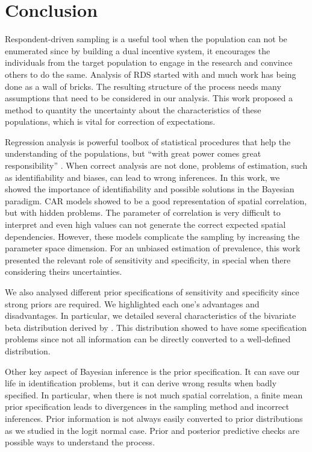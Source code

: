 \chapter{Conclusion}

Respondent-driven sampling is a useful tool when the population can not be
enumerated since by building a dual incentive system, it encourages the
individuals from the target population to engage in the research and convince
others to do the same. Analysis of RDS started with \textcite{heckathorn1997}
and much work has being done as a wall of bricks. The resulting structure of
the process needs many assumptions that need to be considered in our analysis.
This work proposed a method to quantity the uncertainty about the
characteristics of these populations, which is vital for correction of
expectations. 

Regression analysis is powerful toolbox of statistical procedures that help
the understanding of the populations, but ``with great power comes great
responsibility'' \cite[p. 13]{spider_man}. When correct analysis are not done,
problems of estimation, such as identifiability and biases, can lead to wrong
inferences. In this work, we showed the importance of identifiability and
possible solutions in the Bayesian paradigm. CAR models showed to be a good
representation of spatial correlation, but with hidden problems. The parameter of
correlation is very difficult to interpret and even high values can not
generate the correct expected spatial dependencies. However, these models
complicate the sampling by increasing the parameter space dimension. For an unbiased estimation of prevalence, this work presented the relevant 
role of sensitivity and specificity, in special when there considering theirs
uncertainties. 

We also analysed different prior specifications of sensitivity and specificity
since strong priors are required. We highlighted each one's advantages and
disadvantages. In particular, we detailed several characteristics of the
bivariate beta distribution derived by \textcite{olkin2015constructions}. This
distribution showed to have some specification problems since not all
information can be directly converted to a well-defined distribution. 

Other key aspect of Bayesian inference is the prior specification. It can save
our life in identification problems, but it can derive wrong results when
badly specified. In particular, when there is not much spatial correlation, a 
finite mean prior specification leads to divergences in the sampling method
and incorrect inferences. Prior information is not always easily converted to
prior distributions as we studied in the logit normal case. Prior and
posterior predictive checks are possible ways to understand the process. 

